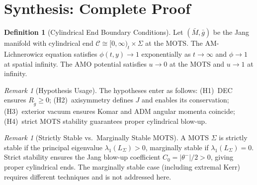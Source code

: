 \documentclass[12pt]{article}
\theoremstyle{plain}
\theoremstyle{definition}
\newtheorem{definition}[theorem]{Definition}
\theoremstyle{remark}
\newtheorem{remark}[theorem]{Remark}
\newcommand{\tg}{\tilde{g}}
\newcommand{\bg}{\bar{g}}
\newcommand{\bM}{\bar{M}}
\begin{document}

\section{Synthesis: Complete Proof}\label{sec:synthesis}

\begin{definition}[Cylindrical End Boundary Conditions]\label{def:cylindrical-bc}
Let $(\bM, \bg)$ be the Jang manifold with cylindrical end $\mathcal{C} \cong [0, \infty)_t \times \Sigma$ at the MOTS. The AM-Lichnerowicz equation satisfies $\phi(t, y) \to 1$ exponentially as $t \to \infty$ and $\phi \to 1$ at spatial infinity. The AMO potential satisfies $u \to 0$ at the MOTS and $u \to 1$ at infinity.
\end{definition}

\begin{remark}[Hypothesis Usage]
The hypotheses enter as follows: (H1)~DEC ensures $R_{\tg} \geq 0$; (H2)~axisymmetry defines $J$ and enables its conservation; (H3)~exterior vacuum ensures Komar and ADM angular momenta coincide; (H4)~strict MOTS stability guarantees proper cylindrical blow-up.
\end{remark}

\begin{remark}[Strictly Stable vs.\ Marginally Stable MOTS]
A MOTS $\Sigma$ is strictly stable if the principal eigenvalue $\lambda_1(L_\Sigma) > 0$, marginally stable if $\lambda_1(L_\Sigma) = 0$. Strict stability ensures the Jang blow-up coefficient $C_0 = |\theta^-|/2 > 0$, giving proper cylindrical ends. The marginally stable case (including extremal Kerr) requires different techniques and is not addressed here.
\end{remark}
\end{document}
